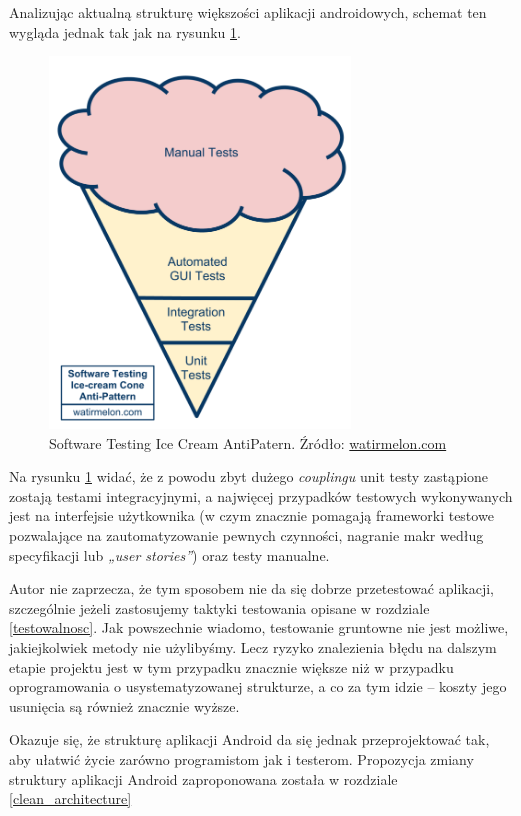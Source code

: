Analizując aktualną strukturę większości aplikacji androidowych, schemat ten wygląda jednak tak jak na rysunku \ref{fig:odwrocona_piramida}.

\begin{figure}[!htb]
    \centering
    \includegraphics[width=8cm]{imgs/ch3_odwrocona_piramida.png}
    \caption
{Software Testing Ice Cream AntiPatern. Źródło: \url{watirmelon.com}}
    \label{fig:odwrocona_piramida}
\end{figure} 

\newpage
Na rysunku \ref{fig:odwrocona_piramida} widać, że z powodu zbyt dużego \textit{couplingu} unit testy zastąpione zostają testami integracyjnymi, a najwięcej przypadków testowych wykonywanych jest na interfejsie użytkownika (w czym znacznie pomagają frameworki testowe pozwalające na zautomatyzowanie pewnych czynności, nagranie makr według specyfikacji lub \textit{„user stories”}) oraz testy manualne.

Autor nie zaprzecza, że tym sposobem nie da się dobrze przetestować aplikacji, szczególnie jeżeli zastosujemy taktyki testowania opisane w rozdziale \ref{testowalnosc}. Jak powszechnie wiadomo, testowanie gruntowne nie jest możliwe, jakiejkolwiek metody nie użylibyśmy. Lecz ryzyko znalezienia błędu na dalszym etapie projektu jest w tym przypadku znacznie większe niż w przypadku oprogramowania o usystematyzowanej strukturze, a co za tym idzie – koszty jego usunięcia są również znacznie wyższe.

Okazuje się, że strukturę aplikacji Android da się jednak przeprojektować tak, aby ułatwić życie zarówno programistom jak i testerom. Propozycja zmiany struktury aplikacji Android zaproponowana została w rozdziale \ref{clean_architecture}

